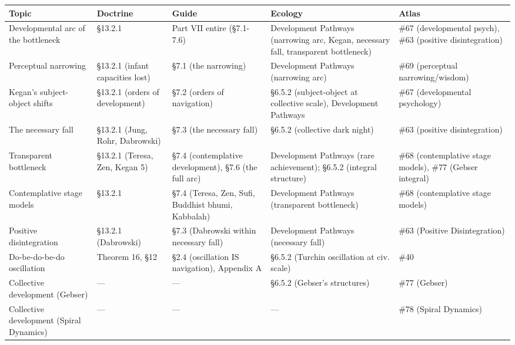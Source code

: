 {\small
\begin{longtable}{>{\raggedright\arraybackslash}p{} >{\raggedright\arraybackslash}p{} >{\raggedright\arraybackslash}p{} >{\raggedright\arraybackslash}p{} >{\raggedright\arraybackslash}p{}}
\toprule
\textbf{Topic} & \textbf{Doctrine} & \textbf{Guide} & \textbf{Ecology} & \textbf{Atlas} \\
\midrule
\endhead
Developmental arc of the bottleneck & §13.2.1 & Part VII entire (§7.1-7.6) & Development Pathways (narrowing arc, Kegan, necessary fall, transparent bottleneck) & \#67 (developmental psych), \#63 (positive disintegration) \\
Perceptual narrowing & §13.2.1 (infant capacities lost) & §7.1 (the narrowing) & Development Pathways (narrowing arc) & \#69 (perceptual narrowing/\allowbreak wisdom) \\
Kegan's subject-object shifts & §13.2.1 (orders of development) & §7.2 (orders of navigation) & §6.5.2 (subject-object at collective scale), Development Pathways & \#67 (developmental psychology) \\
The necessary fall & §13.2.1 (Jung, Rohr, Dabrowski) & §7.3 (the necessary fall) & §6.5.2 (collective dark night) & \#63 (positive disintegration) \\
Transparent bottleneck & §13.2.1 (Teresa, Zen, Kegan 5) & §7.4 (contemplative development), §7.6 (the full arc) & Development Pathways (rare achievement); §6.5.2 (integral structure) & \#68 (contemplative stage models), \#77 (Gebser integral) \\
Contemplative stage models & §13.2.1 & §7.4 (Teresa, Zen, Sufi, Buddhist bhumi, Kabbalah) & Development Pathways (transparent bottleneck) & \#68 (contemplative stage models) \\
Positive disintegration & §13.2.1 (Dabrowski) & §7.3 (Dabrowski within necessary fall) & Development Pathways (necessary fall) & \#63 (Positive Disintegration) \\
Do-be-do-be-do oscillation & Theorem 16, §12 & §2.4 (oscillation IS navigation), Appendix A & §6.5.2 (Turchin oscillation at civ. scale) & \#40 \\
Collective development (Gebser) & — & — & §6.5.2 (Gebser's structures) & \#77 (Gebser) \\
Collective development (Spiral Dynamics) & — & — & — & \#78 (Spiral Dynamics) \\
\bottomrule
\end{longtable}
}



